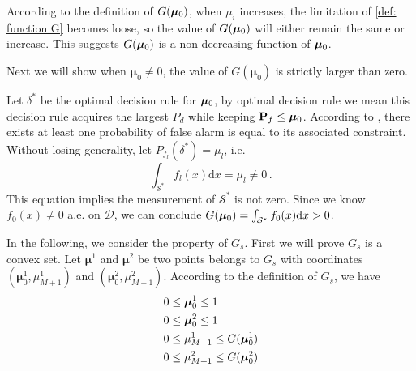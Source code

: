 According to the definition of $G(\boldsymbol{\mu}_0)$, when $\mu_i$ increases, the limitation of \eqref{def: function G} becomes loose, 
so the value of $G(\boldsymbol{\mu}_0)$ will either remain the same or increase. 
This suggests $G(\boldsymbol{\mu}_0)$ is a non-decreasing function of $\boldsymbol{\mu}_0$. 

Next we will show when $\boldsymbol{\mu}_0 \neq 0$, the value of $G(\boldsymbol{\mu}_0)$ is strictly larger than zero.

Let $\delta^\ast$ be the optimal decision rule for $\boldsymbol{\mu}_0$, by optimal decision rule we mean this decision rule acquires the largest $P_d$ while keeping $\mathbf{P}_f \leq \boldsymbol{\mu}_0$. 
According to \cite{zhang2000efficient}, there exists at least one probability of false alarm is equal to its associated constraint. Without losing generality, let $P_{f_l}(\delta^\ast) = \mu_l$, i.e. 
\[
\int_{\mathcal{S}^\ast}f_l(x)\mathrm{d}x = \mu_l \neq 0\,.
\]
This equation implies the measurement of $\mathcal{S}^\ast$  is not zero. Since we know $f_0(x) \neq 0$ a.e. on $\mathcal{D}$, we can conclude $G(\boldsymbol{\mu}_0) = \int_{\mathcal{S}^\ast}f_0(x)\mathrm{d}x > 0$. 

In the following, we consider the property of $G_s$. First we will prove $G_s$ is a convex set. 
Let $\boldsymbol{\mu}^1$ and  $\boldsymbol{\mu}^2$ be two points belongs to $G_s$ with coordinates $(\boldsymbol{\mu}^1_0, \mu_{M+1}^1)$ and $(\boldsymbol{\mu}^2_0, \mu_{M+1}^2)$. According to the definition of $G_s$, we have 
\begin{subequations}
\label{1120t4}
\begin{align}
\label{1120night6}
0 &\leq \boldsymbol{\mu}_0^1 \leq 1\\
\label{1120night7}
0 &\leq \boldsymbol{\mu}^2_0 \leq 1\\
\label{1120night3}
0 &\leq \mu_{M+1}^1 \leq G(\boldsymbol{\mu}_0^1)\\
\label{1120night4}
0 &\leq \mu_{M+1}^2 \leq G(\boldsymbol{\mu}_0^2)
\end{align}
\end{subequations}

